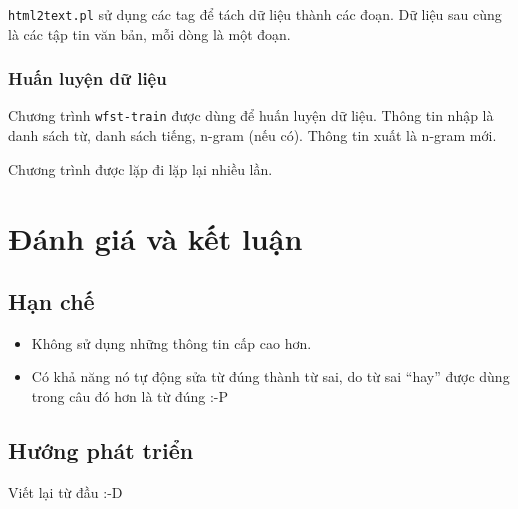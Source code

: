 \documentclass[a4paper,oneside]{book} %
\theoremstyle{break}
\begin{document}
\verb#html2text.pl# sử dụng các tag để tách dữ liệu thành các đoạn. Dữ
liệu sau cùng là các tập tin văn bản, mỗi dòng là một đoạn.

\subsection{Huấn luyện dữ liệu}
\label{sub:training-data}

Chương trình \verb#wfst-train# được dùng để huấn luyện dữ liệu. Thông
tin nhập là danh sách từ, danh sách tiếng, n-gram (nếu có). Thông tin
xuất là n-gram mới.

Chương trình được lặp đi lặp lại nhiều lần.

\chapter{Đánh giá và kết luận}
\label{cha:conclusion}
\minitoc

\section{Hạn chế}
\begin{itemize}
\item Không sử dụng những thông tin cấp cao hơn.
\item Có khả năng nó tự động sửa từ đúng thành từ sai, do từ sai
  ``hay'' được dùng trong câu đó hơn là từ đúng :-P
\end{itemize}

\section{Hướng phát triển}
\label{sec:todo}

Viết lại từ đầu :-D
\end{document}
